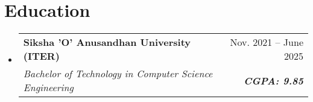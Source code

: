 \newcommand{\resumeItem}[1]{
  \item\small{
    {#1 \vspace{-2pt}}
  }
}

\newcommand{\resumeSubheading}[4]{
  \vspace{2pt}\item
  \begin{tabular*}{0.97\textwidth}[t]{l@{\extracolsep{\fill}}r}
    \textbf{#1} & #2 \\
    \textit{\small#3} & \textit{\small #4} \\
  \end{tabular*}\vspace{-5pt}
}

\newcommand{\resumeSubSubheading}[2]{
  \item
  \begin{tabular*}{0.97\textwidth}{l@{\extracolsep{\fill}}r}
    \textit{\small#1} & \textit{\small #2} \\
  \end{tabular*}\vspace{-7pt}
}

\newcommand{\resumeProjectHeading}[2]{
  \item
  \begin{tabular*}{0.97\textwidth}{l@{\extracolsep{\fill}}r}
    \small#1 & #2 \\
  \end{tabular*}\vspace{-5pt}
}

\newcommand{\resumeSubItem}[1]{\resumeItem{#1}\vspace{-4pt}}

\renewcommand\labelitemii{$\vcenter{\hbox{\tiny$\bullet$}}$}

\newcommand{\resumeSubHeadingListStart}{\begin{itemize}[leftmargin=0.15in, label={}]} 
    \newcommand{\resumeSubHeadingListEnd}{\vspace{-10pt}\end{itemize}}
\newcommand{\resumeItemListStart}{\begin{itemize}}
    \newcommand{\resumeItemListEnd}{\end{itemize}\vspace{0pt}}

\section{Education}
\resumeSubHeadingListStart
\resumeSubheading
{Siksha 'O' Anusandhan University (ITER)}{Nov. 2021 -- June 2025}
{{Bachelor of Technology in Computer Science Engineering}}{ \textbf{CGPA: 9.85} }
\resumeSubHeadingListEnd


